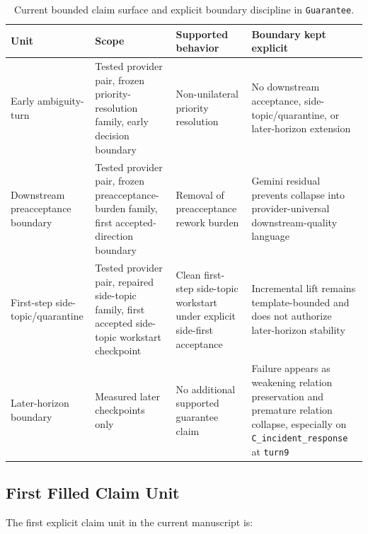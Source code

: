 \documentclass[11pt]{article}
\begin{document}
\begin{table}[ht]
\centering
\begin{tabular}{|p{}|p{}|p{}|p{}|}
\hline
\textbf{Unit} & \textbf{Scope} & \textbf{Supported behavior} & \textbf{Boundary kept explicit} \\
\hline
Early ambiguity-turn & Tested provider pair, frozen priority-resolution family, early decision boundary & Non-unilateral priority resolution & No downstream acceptance, side-topic/quarantine, or later-horizon extension \\
\hline
Downstream preacceptance boundary & Tested provider pair, frozen preacceptance-burden family, first accepted-direction boundary & Removal of preacceptance rework burden & Gemini residual prevents collapse into provider-universal downstream-quality language \\
\hline
First-step side-topic/quarantine & Tested provider pair, repaired side-topic family, first accepted side-topic workstart checkpoint & Clean first-step side-topic workstart under explicit side-first acceptance & Incremental lift remains template-bounded and does not authorize later-horizon stability \\
\hline
Later-horizon boundary & Measured later checkpoints only & No additional supported guarantee claim & Failure appears as weakening relation preservation and premature relation collapse, especially on \texttt{C\_incident\_response} at \texttt{turn9} \\
\hline
\end{tabular}
\caption{Current bounded claim surface and explicit boundary discipline in
\texttt{Guarantee}.}
\end{table}

\subsection{First Filled Claim Unit}

The first explicit claim unit in the current manuscript is:
\end{document}
